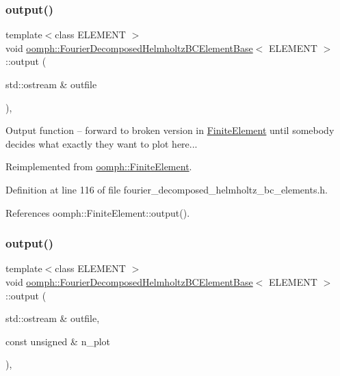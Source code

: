 \subsubsection{\texorpdfstring{output()}{output()}\hspace{0.1cm}{\footnotesize\ttfamily [1/4]}}
{\footnotesize\ttfamily template$<$class E\+L\+E\+M\+E\+NT $>$ \\
void \hyperlink{classoomph_1_1FourierDecomposedHelmholtzBCElementBase}{oomph\+::\+Fourier\+Decomposed\+Helmholtz\+B\+C\+Element\+Base}$<$ E\+L\+E\+M\+E\+NT $>$\+::output (\begin{DoxyParamCaption}\item[{std\+::ostream \&}]{outfile }\end{DoxyParamCaption})\hspace{0.3cm}{\ttfamily [inline]}, {\ttfamily [virtual]}}

Output function -- forward to broken version in \hyperlink{classoomph_1_1FiniteElement}{Finite\+Element} until somebody decides what exactly they want to plot here... 

Reimplemented from \hyperlink{classoomph_1_1FiniteElement_a2ad98a3d2ef4999f1bef62c0ff13f2a7}{oomph\+::\+Finite\+Element}.



Definition at line 116 of file fourier\+\_\+decomposed\+\_\+helmholtz\+\_\+bc\+\_\+elements.\+h.



References oomph\+::\+Finite\+Element\+::output().

\mbox{\label{classoomph_1_1FourierDecomposedHelmholtzBCElementBase_a2caddd8509771b2976895f1f08b90e89}} 
\subsubsection{\texorpdfstring{output()}{output()}\hspace{0.1cm}{\footnotesize\ttfamily [2/4]}}
{\footnotesize\ttfamily template$<$class E\+L\+E\+M\+E\+NT $>$ \\
void \hyperlink{classoomph_1_1FourierDecomposedHelmholtzBCElementBase}{oomph\+::\+Fourier\+Decomposed\+Helmholtz\+B\+C\+Element\+Base}$<$ E\+L\+E\+M\+E\+NT $>$\+::output (\begin{DoxyParamCaption}\item[{std\+::ostream \&}]{outfile,  }\item[{const unsigned \&}]{n\+\_\+plot }\end{DoxyParamCaption})\hspace{0.3cm}{\ttfamily [inline]}, {\ttfamily [virtual]}}



